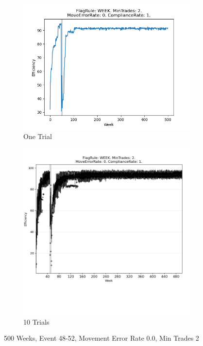 \documentclass{article}%
\begin{document}
\begin{figure}[!htb]%
\begin{subfigure}[b]{0.45\linewidth}%
\includegraphics[width=\linewidth]{1029fr_WEEK_mt_2_er_0_cr_1_t1.png}%
\caption{One Trial}%
\end{subfigure}%
\begin{subfigure}[b]{0.45\linewidth}%
\includegraphics[clip,width=\linewidth,trim=0 4cm 0 0]{1029fr_WEEK_mt_2_er_0_cr_1_t10.png}%
\caption{10 Trials}%
\end{subfigure}%
\caption{500 Weeks, Event 48{-}52, Movement Error Rate 0.0, Min Trades 2}%
\end{figure}
\end{document}
